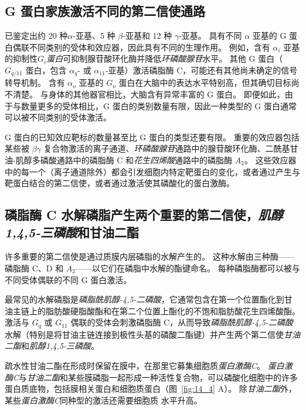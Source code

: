 \subsection{G 蛋白家族激活不同的第二信使通路}

已鉴定出约 20 种$\alpha$-亚基、5 种 $\beta$-亚基和 12 种 $\gamma$-亚基。
具有不同 $\alpha$ 亚基的 G 蛋白偶联不同类别的受体和效应器，因此具有不同的生理作用。
例如，含有 $\alpha _i$ 亚基的抑制性\textit{$G_i $蛋白}可抑制腺苷酸环化酶并降低\textit{环磷酸腺苷}水平。
其他 G 蛋白（$ G_{q/11} $ 蛋白，包含 $\alpha_q$- 或 $\alpha_{11}$-亚基）激活磷脂酶 C，可能还有其他尚未确定的信号转导机制。
含有 $\alpha_o$ 亚基的 $G_o$ 蛋白在大脑中的表达水平特别高，但其确切目标尚不清楚。
与身体的其他器官相比，大脑含有异常丰富的 G 蛋白。
即便如此，由于与数量更多的受体相比，G 蛋白的类别数量有限，因此一种类型的 G 蛋白通常可以被不同类别的受体激活。


G 蛋白的已知效应靶标的数量甚至比 G 蛋白的类型还要有限。
重要的效应器包括某些被 $\beta \gamma$ 复合物激活的离子通道、\textit{环磷酸腺苷}通路中的腺苷酸环化酶、二酰基甘油-肌醇多磷酸通路中的磷脂酶 C 和\textit{花生四烯酸}通路中的磷脂酶 $A_2$。
这些效应器中的每一个（离子通道除外）都会引发细胞内特定靶蛋白的变化，或者通过产生与靶蛋白结合的第二信使，或者通过激活使其磷酸化的蛋白激酶。



\subsection{磷脂酶 C 水解磷脂产生两个重要的第二信使，\textit{肌醇1,4,5-三磷酸}和甘油二酯}

许多重要的第二信使是通过质膜内层磷脂的水解产生的。 
这种水解由三种酶——磷脂酶 C、D 和 $A_2$——以它们在磷脂中水解的酯键命名。
每种磷脂酶都可以被与不同受体偶联的不同 G 蛋白激活。


最常见的水解磷脂是\textit{磷脂酰肌醇-4,5-二磷酸}，它通常包含在第一个位置酯化到甘油主链上的脂肪酸硬脂酸酯和在第二个位置上酯化的不饱和脂肪酸花生四烯酸酯。
激活与 $ G_q $ 或 $ G_{11} $ 偶联的受体会刺激磷脂酶 C，从而导致\textit{磷脂酰肌醇-4,5-二磷酸}水解（特别是将甘油主链连接到极性头基的磷酸二酯键）并产生两个第二信使\textit{甘油二酯}和\textit{肌醇1,4,5-三磷酸}。


疏水性甘油二酯在形成时保留在膜中，在那里它募集细胞质\textit{蛋白激酶C}。
\textit{蛋白激酶C}与\textit{甘油二酯}和某些膜磷脂一起形成一种活性复合物，可以磷酸化细胞中的许多蛋白质底物，包括膜相关蛋白和细胞质蛋白（图~\ref{fig:14_4} A）。
除\textit{甘油二酯}外，某些\textit{蛋白激酶C}同种型的激活还需要细胞质  水平升高。


